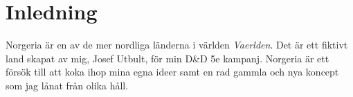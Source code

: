 \chapter*{Inledning}
Norgeria är en av de mer nordliga länderna i världen \textit{Vaerlden}. Det är ett fiktivt land skapat av mig, Josef Utbult, för min D\&D 5e kampanj. Norgeria är ett försök till att koka ihop mina egna ideer samt en rad gammla och nya koncept som jag lånat från olika håll. 




